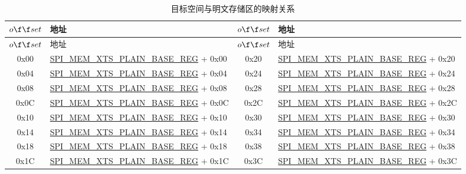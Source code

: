 \begin{longtable}[c]
{ |c|p{5.2cm} |c|p{5.2cm}|}
\caption{目标空间与明文存储区的映射关系} 
\label{tab:extmemencr-data-padding}\\
\hline 
\rowcolor{lightgray}
$o{\f}{\f}set$ &  地址  & $o{\f}{\f}set$ &  地址 \\\hline
\endfirsthead
\hline
\rowcolor{lightgray}
$o{\f}{\f}set$ &  地址  & $o{\f}{\f}set$ &  地址   \\\hline
\endhead
\endfoot
0x00 & \hyperref[regdesc:SPIMEMXTSPLAINBASEREG]{SPI\_MEM\_XTS\_PLAIN\_BASE\_REG} + 0x00 & 0x20 & \hyperref[regdesc:SPIMEMXTSPLAINBASEREG]{SPI\_MEM\_XTS\_PLAIN\_BASE\_REG} + 0x20 \\\hline 
0x04 & \hyperref[regdesc:SPIMEMXTSPLAINBASEREG]{SPI\_MEM\_XTS\_PLAIN\_BASE\_REG} + 0x04 & 0x24 & \hyperref[regdesc:SPIMEMXTSPLAINBASEREG]{SPI\_MEM\_XTS\_PLAIN\_BASE\_REG} + 0x24 \\\hline 
0x08 & \hyperref[regdesc:SPIMEMXTSPLAINBASEREG]{SPI\_MEM\_XTS\_PLAIN\_BASE\_REG} + 0x08 & 0x28 & \hyperref[regdesc:SPIMEMXTSPLAINBASEREG]{SPI\_MEM\_XTS\_PLAIN\_BASE\_REG} + 0x28 \\\hline 
0x0C & \hyperref[regdesc:SPIMEMXTSPLAINBASEREG]{SPI\_MEM\_XTS\_PLAIN\_BASE\_REG} + 0x0C & 0x2C & \hyperref[regdesc:SPIMEMXTSPLAINBASEREG]{SPI\_MEM\_XTS\_PLAIN\_BASE\_REG} + 0x2C \\\hline 
0x10 & \hyperref[regdesc:SPIMEMXTSPLAINBASEREG]{SPI\_MEM\_XTS\_PLAIN\_BASE\_REG} + 0x10 & 0x30 & \hyperref[regdesc:SPIMEMXTSPLAINBASEREG]{SPI\_MEM\_XTS\_PLAIN\_BASE\_REG} + 0x30 \\\hline 
0x14 & \hyperref[regdesc:SPIMEMXTSPLAINBASEREG]{SPI\_MEM\_XTS\_PLAIN\_BASE\_REG} + 0x14 & 0x34 & \hyperref[regdesc:SPIMEMXTSPLAINBASEREG]{SPI\_MEM\_XTS\_PLAIN\_BASE\_REG} + 0x34 \\\hline 
0x18 & \hyperref[regdesc:SPIMEMXTSPLAINBASEREG]{SPI\_MEM\_XTS\_PLAIN\_BASE\_REG} + 0x18 & 0x38 & \hyperref[regdesc:SPIMEMXTSPLAINBASEREG]{SPI\_MEM\_XTS\_PLAIN\_BASE\_REG} + 0x38 \\\hline 
0x1C & \hyperref[regdesc:SPIMEMXTSPLAINBASEREG]{SPI\_MEM\_XTS\_PLAIN\_BASE\_REG} + 0x1C & 0x3C & \hyperref[regdesc:SPIMEMXTSPLAINBASEREG]{SPI\_MEM\_XTS\_PLAIN\_BASE\_REG} + 0x3C \\\hline 
\end{longtable}
